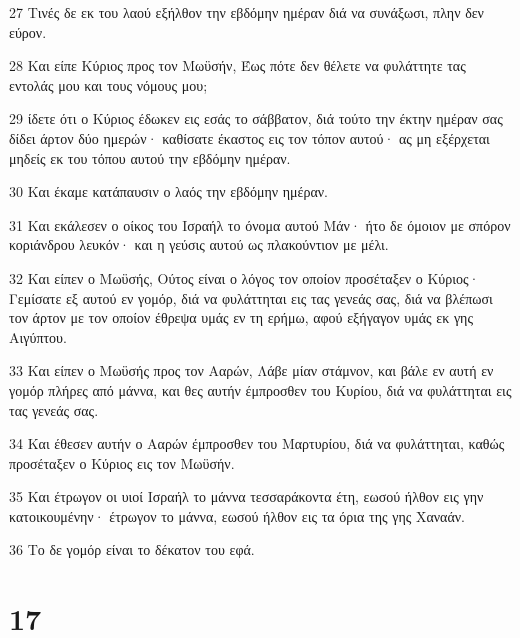 \par 27 Τινές δε εκ του λαού εξήλθον την εβδόμην ημέραν διά να συνάξωσι, πλην δεν εύρον.
\par 28 Και είπε Κύριος προς τον Μωϋσήν, Έως πότε δεν θέλετε να φυλάττητε τας εντολάς μου και τους νόμους μου;
\par 29 ίδετε ότι ο Κύριος έδωκεν εις εσάς το σάββατον, διά τούτο την έκτην ημέραν σας δίδει άρτον δύο ημερών· καθίσατε έκαστος εις τον τόπον αυτού· ας μη εξέρχεται μηδείς εκ του τόπου αυτού την εβδόμην ημέραν.
\par 30 Και έκαμε κατάπαυσιν ο λαός την εβδόμην ημέραν.
\par 31 Και εκάλεσεν ο οίκος του Ισραήλ το όνομα αυτού Μάν· ήτο δε όμοιον με σπόρον κοριάνδρου λευκόν· και η γεύσις αυτού ως πλακούντιον με μέλι.
\par 32 Και είπεν ο Μωϋσής, Ούτος είναι ο λόγος τον οποίον προσέταξεν ο Κύριος· Γεμίσατε εξ αυτού εν γομόρ, διά να φυλάττηται εις τας γενεάς σας, διά να βλέπωσι τον άρτον με τον οποίον έθρεψα υμάς εν τη ερήμω, αφού εξήγαγον υμάς εκ γης Αιγύπτου.
\par 33 Και είπεν ο Μωϋσής προς τον Ααρών, Λάβε μίαν στάμνον, και βάλε εν αυτή εν γομόρ πλήρες από μάννα, και θες αυτήν έμπροσθεν του Κυρίου, διά να φυλάττηται εις τας γενεάς σας.
\par 34 Και έθεσεν αυτήν ο Ααρών έμπροσθεν του Μαρτυρίου, διά να φυλάττηται, καθώς προσέταξεν ο Κύριος εις τον Μωϋσήν.
\par 35 Και έτρωγον οι υιοί Ισραήλ το μάννα τεσσαράκοντα έτη, εωσού ήλθον εις γην κατοικουμένην· έτρωγον το μάννα, εωσού ήλθον εις τα όρια της γης Χαναάν.
\par 36 Το δε γομόρ είναι το δέκατον του εφά.

\chapter{17}

